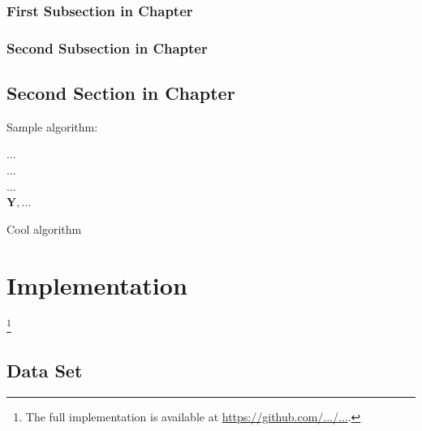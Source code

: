 \documentclass[12pt,twoside,a4paper,parskip]{scrbook} %
\def\git{https://github.com/.../...}
\begin{document}
\subsection{First Subsection in Chapter}
\lipsum[2]

\subsection{Second Subsection in Chapter}
\lipsum[2]

\section{Second Section in Chapter}

Sample algorithm:

\vspace{0.25cm}
\begin{algorithm}[H]
	...
	 \\
	...\\
	... \\
	\Return $\mathbf{Y}, ...$
	\caption{Cool algorithm \cite{goodfellow2016deep}}
	\label{alg:cool_algorithm}
\end{algorithm}
\vspace{0.25cm}


\chapter{Implementation}\label{chapter:implementation}
\lipsum[3]\footnote{The full implementation is available at \url{\git}.}

\section{Data Set}\label{sec:dataset}
\lipsum[1-2]

\vspace{0.75cm}
\begin{figure}[H]
	\captionsetup[subfloat]{justification=centering}
	\hspace{1mm}%
	\hspace{1mm}%
	\hspace{1mm}%
	\hspace{1mm}%
\end{figure}	
\newpage
\end{document}
